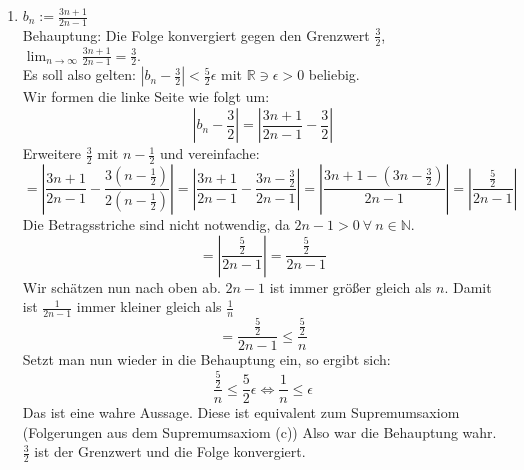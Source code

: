 \documentclass{article}
\begin{document}
\begin{enumerate}[ label= (\roman*) ]
        \item \(b_n := \frac{ 3n + 1 }{ 2n - 1 } \) \\
        Behauptung: Die Folge konvergiert gegen den Grenzwert \( \frac{3}{2} \), \(\lim_{n \to \infty } \frac{ 3n + 1 }{ 2n - 1 } = \frac{3}{2} \). \\
        Es soll also gelten: \( |b_n - \frac{3}{2}| < \frac{5}{2} \epsilon \)  mit \( \mathbb{R} \ni \epsilon > 0\) beliebig. \\
        Wir formen die linke Seite wie folgt um:
        \[ |b_n - \frac{3}{2}| = | \frac{ 3n + 1 }{ 2n - 1 } - \frac{3}{2} | \]
        Erweitere \( \frac{3}{2} \) mit \( n - \frac{1}{2} \) und vereinfache:
        \[ 
            = \left| \frac{ 3n + 1 }{ 2n - 1 } - \frac{ 3 (n - \frac{1}{2}) }{ 2 (n - \frac{1}{2}) } \right|
            = \left| \frac{ 3n + 1 }{ 2n - 1 } - \frac{ 3n - \frac{3}{2}}{ 2n - 1 } \right|
            = \left| \frac{ 3n + 1 - ( 3n - \frac{3}{2} ) }{ 2n - 1 } \right|
            = \left| \frac{ \frac{5}{2} }{ 2n - 1 } \right|
        \]
        Die Betragsstriche sind nicht notwendig, da \(2n - 1 > 0 \: \forall \: n \in \mathbb{N} \).
        \[
            = \left| \frac{ \frac{5}{2} }{ 2n - 1 } \right|
            = \frac{ \frac{5}{2} }{ 2n - 1 }
        \]
        Wir schätzen nun nach oben ab. \( 2n - 1\) ist immer größer gleich als \(n\).
        Damit ist \( \frac{1}{ 2n -1 } \) immer kleiner gleich als \( \frac{1}{n} \)
        \[
            = \frac{ \frac{5}{2} }{ 2n - 1 } \leq \frac{ \frac{5}{2} }{ n }
        \]
        Setzt man nun wieder in die Behauptung ein, so ergibt sich:
        \[
            \frac{ \frac{5}{2} }{ n } \leq \frac{5}{2} \epsilon
            \Leftrightarrow \frac{ 1 }{ n } \leq \epsilon
        \]
        Das ist eine wahre Aussage. Diese ist equivalent zum Supremumsaxiom (Folgerungen aus dem Supremumsaxiom (c))
        Also war die Behauptung wahr. \(\frac{3}{2}\) ist der Grenzwert und die Folge konvergiert.


\end{enumerate}
\end{document}
